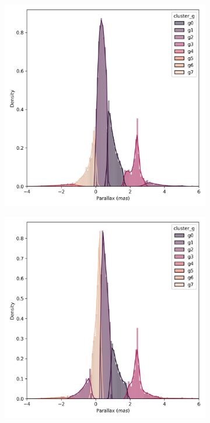 \documentclass[preprint,12pt,authoryear]{elsarticle}
\begin{document}
\begin{figure}[!hbt]
  \begin{subfigure}{0.29\textwidth}
    \includegraphics[width=\textwidth]{../figures/ngc_2516/kmeans_parallax_ngc_2516.png}
  \end{subfigure}
  \begin{subfigure}{0.29\textwidth}
    \includegraphics[width=\textwidth]{../figures/ngc_2516/dec_parallax_ngc_2516.png}

\end{subfigure}
\end{figure}
\end{document}
